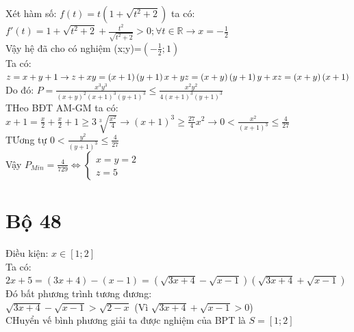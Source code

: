 Xét hàm số: $f\left ( t \right )=t\left ( 1+\sqrt{t^{2}+2} \right )$ ta có:\\
$f'\left ( t \right )=1+\sqrt{t^{2}+2}+\frac{t^{2}}{\sqrt{t^{2}+2}}> 0;\forall t\in \mathbb{R}\rightarrow x=-\frac{1}{2}$\\
Vậy hệ đã cho có nghiệm (x;y)=$\left ( -\frac{1}{2};1 \right )$\\

\lgi 
Ta có: $z=x+y+1\rightarrow z+xy=\left ( x+1 \right )\left ( y+1 \right )\\
x+yz=\left ( x+y \right )\left ( y+1 \right )\\
y+xz=\left ( x+y \right )\left ( x+1 \right )$\\
Do đó: $P=\frac{x^{3}y^{3}}{\left ( x+y \right )^{2}\left ( x+1 \right )^{3}\left ( y+1 \right )^{3}}\leq \frac{x^{2}y^{2}}{4\left ( x+1 \right )^{3}\left ( y+1 \right )^{3}}$\\
THeo BĐT AM-GM ta có:\\
$x+1=\frac{x}{2}+\frac{x}{2}+1\geq 3\sqrt[3]{\frac{x^{2}}{4}}\rightarrow \left ( x+1 \right )^{3}\geq \frac{27}{4}x^{2}\rightarrow 0< \frac{x^{2}}{\left ( x+1 \right )^{3}}\leq \frac{4}{27}$\\
TƯơng tự $0< \frac{y^{2}}{\left ( y+1 \right )^{3}}\leq \frac{4}{27}$\\
Vậy $P_{Min}=\frac{4}{729}\Leftrightarrow \left\{\begin{matrix}
x=y=2 &  & \\ 
z=5 &  & 
\end{matrix}\right.$\\

\section{Bộ 48}
\hda 
Điều kiện: $x\in \left [ 1;2 \right ]$\\
Ta có: $2x+5=(3x+4)-(x-1)=(\sqrt{3x+4}-\sqrt{x-1})(\sqrt{3x+4}+\sqrt{x-1})$\\
Đó bất phương trình tương đương:\\
$\sqrt{3x+4}-\sqrt{x-1}> \sqrt{2-x}$ (Vì $\sqrt{3x+4}+\sqrt{x-1}> 0$)\\
CHuyển vế bình phương giải ta được nghiệm của BPT là $S=\left [ 1;2 \right ]$\\

